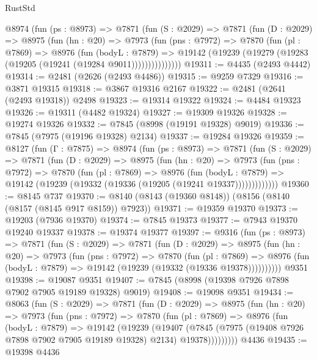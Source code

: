 \begin{lexlean}{RustStd}
\begin{coremodule}
      @8974
        (fun (ps : @8973) =>
        @7871
          (fun (S : @2029) =>
          @7871
            (fun (D : @2029) =>
            @8975
              (fun (hn : @20) =>
              @7973
                (fun (pns : @7972) =>
                @7870
                  (fun (pl : @7869) =>
                  @8976
                    (fun (bodyL : @7879) =>
                    @19142 (@19239 (@19279 (@19283 (@19205 (@19241 (@19284 @9011)))))))))))))))
@19311 := @4435 (@2493 @4442)
@19314 := @2481 (@2626 (@2493 @4486))
@19315 := @9259 @7329
@19316 := @3871 @19315
@19318 := @3867 @19316 @2167
@19322 := @2481 (@2641 (@2493 @19318)) @2498
@19323 := @19314 @19322
@19324 := @4484 @19323
@19326 := @19311 (@4482 @19324)
@19327 := @19309 @19326
@19328 := @19274 @19326
@19332 := @7845 (@8998 (@19191 @19328) @9019)
@19336 := @7845 (@7975 (@19196 @19328) @2134)
@19337 := @19284 @19326
@19359 := @8127
    (fun (Γ : @7875) =>
    @8974
      (fun (ps : @8973) =>
      @7871
        (fun (S : @2029) =>
        @7871
          (fun (D : @2029) =>
          @8975
            (fun (hn : @20) =>
            @7973
              (fun (pns : @7972) =>
              @7870
                (fun (pl : @7869) =>
                @8976
                  (fun (bodyL : @7879) =>
                  @19142 (@19239 (@19332 (@19336 (@19205 (@19241 @19337)))))))))))))
@19360 := @8145 @737
@19370 := @8140 (@8143 (@19360 @8148)) (@8156 (@8140 (@8157 (@8145 @917 @8159)) @7923))
@19371 := @19359 @19370
@19373 := @19203 (@7936 @19370)
@19374 := @7845 @19373
@19377 := @7943 @19370 @19240 @19337
@19378 := @19374 @19377
@19397 := @9316
    (fun (ps : @8973) =>
    @7871
      (fun (S : @2029) =>
      @7871
        (fun (D : @2029) =>
        @8975
          (fun (hn : @20) =>
          @7973
            (fun (pns : @7972) =>
            @7870
              (fun (pl : @7869) =>
              @8976 (fun (bodyL : @7879) => @19142 (@19239 (@19332 (@19336 @19378))))))))))
    @9351
@19398 := @19087 @9351
@19407 := @7845 (@8998 (@19398 @7926 @7898 @7902 @7905 @19189 @19328) @9019)
@19408 := @19098 @9351
@19434 := @8063
    (fun (S : @2029) =>
    @7871
      (fun (D : @2029) =>
      @8975
        (fun (hn : @20) =>
        @7973
          (fun (pns : @7972) =>
          @7870
            (fun (pl : @7869) =>
            @8976
              (fun (bodyL : @7879) =>
              @19142
                (@19239
                  (@19407
                    (@7845
                      (@7975 (@19408 @7926 @7898 @7902 @7905 @19189 @19328) @2134)
                      @19378)))))))))
    @4436
@19435 := @19398 @4436

\end{coremodule}
\end{lexlean}
